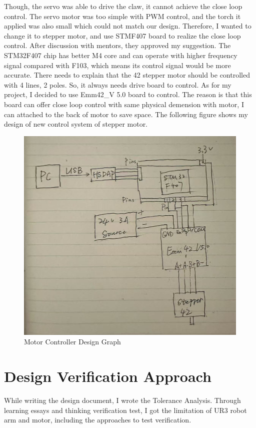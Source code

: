 \documentclass{senior-design-individual}
\begin{document}
Though, the servo was able to drive the claw, it cannot achieve the close loop control. The servo motor was too simple with PWM control, and the torch it applied was also small which could not match our design. Therefore, I wanted to change it to stepper motor, and use STMF407 board to realize the close loop control. After discussion with mentors, they approved my suggestion.
The STM32F407 chip has better M4 core and can operate with higher frequency signal compared with F103, which means its control signal would be more accurate. There needs to explain that the 42 stepper motor should be controlled with 4 lines, 2 poles. So, it always needs drive board to control. As for my project, I decided to use Emm42\_V 5.0 board to control. The reason is that this board can offer close loop control with same physical demension with motor, I can attached to the back of motor to save space. The following figure shows my design of new control system of stepper motor.
\begin{figure}[h]
    \centering
    \includegraphics[width=0.8\linewidth]{Motor Controller.png}
    \caption{Motor Controller Design Graph}
\end{figure}
\section{Design Verification Approach}
While writing the design document, I wrote the Tolerance Analysis. Through learning essays and thinking verification test, I got the limitation of UR3 robot arm and motor, including the approaches to test verification.
\end{document}

